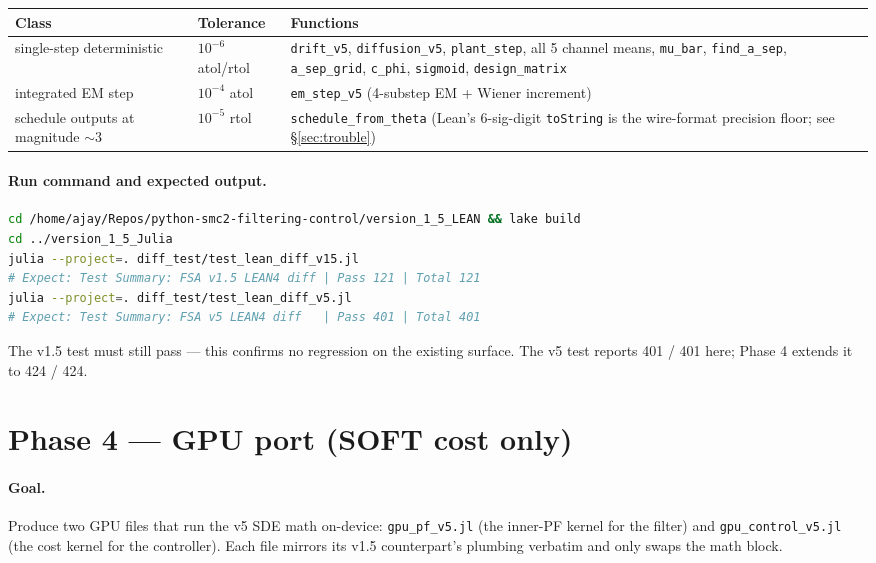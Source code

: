 \documentclass[11pt,a4paper]{article}
\begin{document}
\begin{center}\footnotesize
\begin{tabular}{lll}
\toprule
Class                                          & Tolerance & Functions \\
\midrule
single-step deterministic                      & $10^{-6}$ atol/rtol & \texttt{drift\_v5}, \texttt{diffusion\_v5}, \texttt{plant\_step}, all 5 channel means, \texttt{mu\_bar}, \texttt{find\_a\_sep}, \texttt{a\_sep\_grid}, \texttt{c\_phi}, \texttt{sigmoid}, \texttt{design\_matrix} \\
integrated EM step                             & $10^{-4}$ atol      & \texttt{em\_step\_v5} (4-substep EM + Wiener increment) \\
schedule outputs at magnitude $\sim 3$         & $10^{-5}$ rtol      & \texttt{schedule\_from\_theta} (Lean's 6-sig-digit \texttt{toString} is the wire-format precision floor; see \S\ref{sec:trouble}) \\
\bottomrule
\end{tabular}
\end{center}

\paragraph{Run command and expected output.}

\begin{lstlisting}[language=bash]
cd /home/ajay/Repos/python-smc2-filtering-control/version_1_5_LEAN && lake build
cd ../version_1_5_Julia
julia --project=. diff_test/test_lean_diff_v15.jl
# Expect: Test Summary: FSA v1.5 LEAN4 diff | Pass 121 | Total 121
julia --project=. diff_test/test_lean_diff_v5.jl
# Expect: Test Summary: FSA v5 LEAN4 diff   | Pass 401 | Total 401
\end{lstlisting}

The v1.5 test must still pass --- this confirms no regression on
the existing surface. The v5 test reports 401 / 401 here; Phase 4
extends it to 424 / 424.


\section{Phase 4 --- GPU port (SOFT cost only)}
\label{sec:phase4}

\paragraph{Goal.} Produce two GPU files that run the v5 SDE math
on-device: \texttt{gpu\_pf\_v5.jl} (the inner-PF kernel for the
filter) and \texttt{gpu\_control\_v5.jl} (the cost kernel for the
controller). Each file mirrors its v1.5 counterpart's plumbing
verbatim and only swaps the math block.
\end{document}
